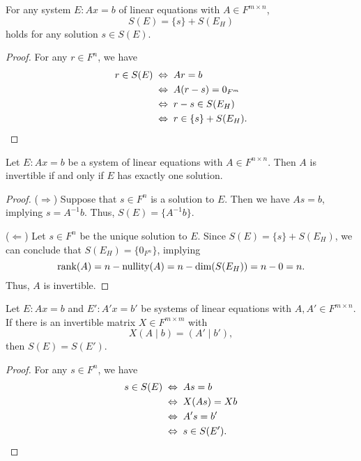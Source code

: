 \begin{proposition}
  For any system $E: Ax = b$ of linear equations with $A \in F^{m \times n}$,
  \begin{equation*}
    S(E) = \{s\} + S(E_H)
  \end{equation*}
  holds for any solution $s \in S(E)$.
\end{proposition}
\begin{proof}
  For any $r \in F^n$, we have
  \begin{align*}
    r \in S(E)
    &\; \Leftrightarrow \; Ar = b \\
    &\; \Leftrightarrow \; A(r - s) = 0_{F^m} \\
    &\; \Leftrightarrow \; r - s \in S(E_H) \\
    &\; \Leftrightarrow \; r \in \{s\} + S(E_H).
    \qedhere
  \end{align*}
\end{proof}

\begin{theorem}
  \label{thm:num-solutions}
  Let $E: Ax = b$ be a system of linear equations with $A \in F^{n \times n}$.
  Then $A$ is invertible if and only if $E$ has exactly one solution.
\end{theorem}
\begin{proof}
  ($\Rightarrow$)
  Suppose that $s \in F^n$ is a solution to $E$.
  Then we have $As = b$, implying $s = A^{-1}b$.
  Thus, $S(E) = \{A^{-1}b\}$.

  ($\Leftarrow$)
  Let $s \in F^n$ be the unique solution to $E$.
  Since $S(E) = \{s\} + S(E_H)$, we can conclude that $S(E_H) = \{0_{F^n}\}$,
  implying
  \begin{equation*}
    \operatorname{rank}(A) = n - \operatorname{nullity}(A) = n - \dim(S(E_H)) = n - 0 = n.
  \end{equation*}
  Thus, $A$ is invertible.
\end{proof}

\begin{theorem}
  Let $E: Ax = b$ and $E': A'x = b'$ be systems of linear equations with
  $A, A' \in F^{m \times n}$.
  If there is an invertible matrix $X \in F^{m \times m}$ with
  \begin{equation*}
    X(A \mid b) = (A' \mid b'),
  \end{equation*}
  then $S(E) = S(E')$.
\end{theorem}
\begin{proof}
  For any $s \in F^n$, we have
  \begin{align*}
    s \in S(E)
    &\; \Leftrightarrow \; As = b \\
    &\; \Leftrightarrow \; X(As) = Xb \\
    &\; \Leftrightarrow \; A's = b' \\
    &\; \Leftrightarrow \; s \in S(E').
    \qedhere
  \end{align*}
\end{proof}